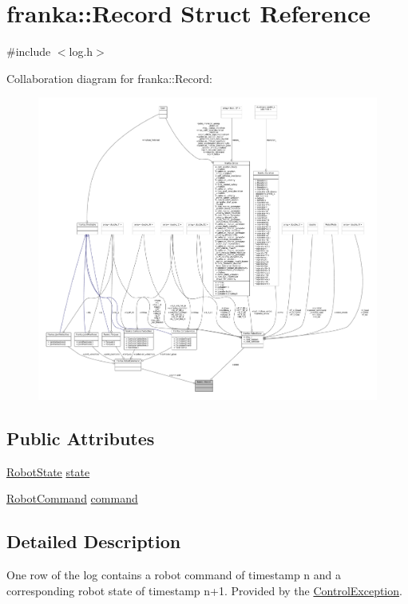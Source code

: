 \hypertarget{structfranka_1_1Record}{}\section{franka\+:\+:Record Struct Reference}
\label{structfranka_1_1Record}


{\ttfamily \#include $<$log.\+h$>$}



Collaboration diagram for franka\+:\+:Record\+:
\nopagebreak
\begin{figure}[H]
\begin{center}
\leavevmode
\includegraphics[width=350pt]{structfranka_1_1Record__coll__graph}
\end{center}
\end{figure}
\subsection*{Public Attributes}
\begin{DoxyCompactItemize}
\item 
\hyperlink{structfranka_1_1RobotState}{Robot\+State} \hyperlink{structfranka_1_1Record_a58249658c9549fbc792eea90e7b6a7cc}{state}
\item 
\hyperlink{structfranka_1_1RobotCommand}{Robot\+Command} \hyperlink{structfranka_1_1Record_a8106f2ba9c2cf5ec7cbcf914c4c99e9c}{command}
\end{DoxyCompactItemize}


\subsection{Detailed Description}
One row of the log contains a robot command of timestamp n and a corresponding robot state of timestamp n+1. Provided by the \hyperlink{structfranka_1_1ControlException}{Control\+Exception}. 

